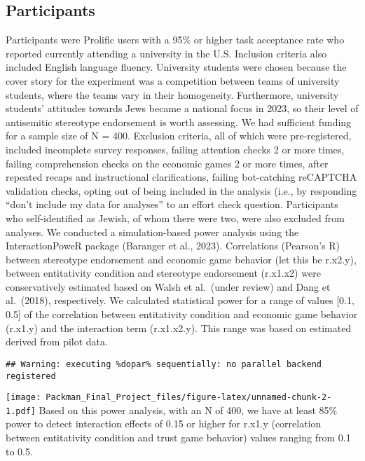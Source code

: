 \documentclass[
  doc,draftall]{apa6}
\begin{document}
\subsection{Participants}\label{participants}

Participants were Prolific users with a 95\% or higher task acceptance rate who reported currently attending a university in the U.S. Inclusion criteria also included English language fluency. University students were chosen because the cover story for the experiment was a competition between teams of university students, where the teams vary in their homogeneity. Furthermore, university students' attitudes towards Jews became a national focus in 2023, so their level of antisemitic stereotype endorsement is worth assessing. We had sufficient funding for a sample size of N = 400.
Exclusion criteria, all of which were pre-registered, included incomplete survey responses, failing attention checks 2 or more times, failing comprehension checks on the economic games 2 or more times, after repeated recaps and instructional clarifications, failing bot-catching reCAPTCHA validation checks, opting out of being included in the analysis (i.e., by responding ``don't include my data for analyses'' to an effort check question. Participants who self-identified as Jewish, of whom there were two, were also excluded from analyses.
We conducted a simulation-based power analysis using the InteractionPoweR package (Baranger et al., 2023). Correlations (Pearson's R) between stereotype endorsement and economic game behavior (let this be r.x2.y), between entitativity condition and stereotype endorsement (r.x1.x2) were conservatively estimated based on Walsh et al.~(under review) and Dang et al.~(2018), respectively. We calculated statistical power for a range of values {[}0.1, 0.5{]} of the correlation between entitativity condition and economic game behavior (r.x1.y) and the interaction term (r.x1.x2.y). This range was based on estimated derived from pilot data.

\begin{verbatim}
## Warning: executing %dopar% sequentially: no parallel backend registered
\end{verbatim}

\texttt{[image: Packman\_Final\_Project\_files/figure-latex/unnamed-chunk-2-1.pdf]}
Based on this power analysis, with an N of 400, we have at least 85\% power to detect interaction effects of 0.15 or higher for r.x1.y (correlation between entitativity condition and trust game behavior) values ranging from 0.1 to 0.5.
\end{document}
